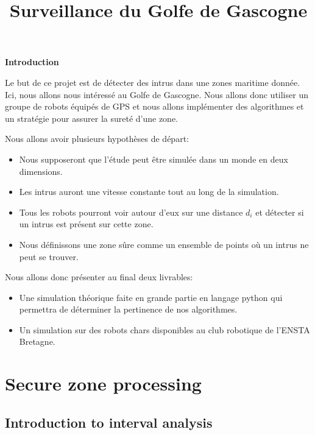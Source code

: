 \documentclass[10pt,a4paper]{report}
\begin{document}
\title{\textbf{ {\Huge Surveillance du Golfe de Gascogne}}}

\maketitle

\pagebreak

\begin{LARGE}
\textbf{Introduction}
\end{LARGE}



\bigskip

Le but de ce projet est de détecter des intrus dans une zones maritime donnée. Ici, nous allons nous intéressé au Golfe de Gascogne. Nous allons donc utiliser un groupe de robots équipés de GPS et nous allons implémenter des algorithmes et un stratégie pour assurer la sureté d'une zone. 

\bigskip

Nous allons avoir plusieurs hypothèses de départ:
\begin{itemize}
\item Nous supposeront que l'étude peut être simulée dans un monde en deux dimensions.
\item Les intrus auront une vitesse constante tout au long de la simulation.
\item Tous les robots pourront voir autour d'eux sur une distance $d_{i}$ et détecter si  un intrus est présent sur cette zone.
\item Nous définissons une zone sûre comme un ensemble de points où un intrus ne peut se trouver.
\end{itemize}

\bigskip

Nous allons donc présenter au final deux livrables:
\begin{itemize}
\item Une simulation théorique faite en grande partie en langage python qui permettra de déterminer la pertinence de nos algorithmes.
\item Un simulation sur des robots chars disponibles au club robotique de l'ENSTA Bretagne.
\end{itemize}

\chapter{Secure zone processing}

\section{Introduction to interval analysis}
\end{document}
